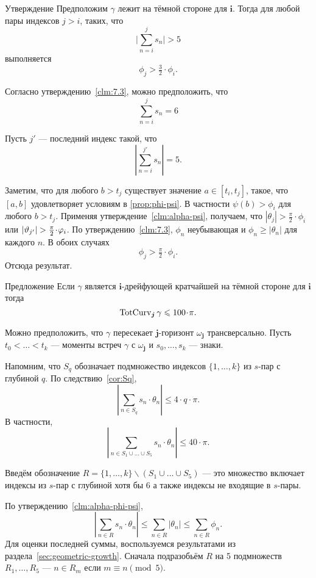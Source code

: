 \documentclass[a4paper,10pt]{article}
\begin{document}
\begin{thm}{Утверждение}\label{clm:geometric-grouth}
Предположим $\gamma$ лежит на тёмной стороне для $\bm{i}$.
Тогда для любой пары индексов $j>i$,
таких, что
\[\bigl|\sum_{n=i}^{j}s_n\bigr|> 5\]
выполняется
\[\phi_j>\tfrac32\cdot\phi_i.\]

\end{thm}


Согласно утверждению~\ref{clm:7.3}, можно предположить, что 
\[\sum_{n=i}^{j}s_n= 6\]

Пусть $j'$ --- последний индекс такой, что
\[|\sum_{n=i}^{j'} s_n|=5.\]

Заметим, что для любого $b>t_j$ существует значение $a\in[t_i,t_j]$,
такое, что $[a,b]$ удовлетворяет условиям в \ref{prop:phi-psi}.
В частности $\psi(b)>\phi_i$ для любого $b>t_j$.
Применяя утверждение~\ref{clm:alpha-psi},
получаем, что $|\theta_j|>\tfrac\pi2\cdot \phi_i$ или
$|\theta_{j'}|\zz>\tfrac\pi2\cdot \phi_i$.
По утверждению~\ref{clm:7.3}, $\phi_n$ неубывающая и $\phi_n\ge |\theta_n|$ для каждого $n$.
В обоих случаях
\[\phi_j>\tfrac\pi2\cdot \phi_i.\]
Отсюда результат.
\qeds



\begin{thm}{Предложение}\label{prop:graph}
Если $\gamma$ является $\bm{i}$-дрейфующей кратчайшей на тёмной стороне для $\bm{i}$ тогда
\[\tc_{\bm{j}}\gamma\le 100\cdot\pi.\]

\end{thm}

Можно предположить, что
$\gamma$ пересекает $\bm{j}$-горизонт $\omega_{\bm{j}}$ трансверсально.
Пусть $t_0<\dots<t_k$ --- моменты встреч $\gamma$ с $\omega_{\bm{j}}$ и
$s_0,\dots,s_k$ --- знаки.

Напомним, что $S_q$ обозначает подмножество индексов $\{1,\dots,k\}$ из $s$-пар с глубиной $q$.
По следствию~\ref{cor:Sq},
\[\left|\sum_{n\in S_q}s_n\cdot\theta_n\right|\le 4\cdot q\cdot \pi.\]
В частности,
\[\left|\sum_{n\in S_1\cup\dots\cup S_5}
s_n\cdot\theta_n\right|
\le 
40\cdot\pi.\]

Введём обозначение $R=\{1,\dots,k\}\backslash (S_1\cup\dots\cup S_5)$ ---
это множество включает индексы из $s$-пар с глубиной хотя бы $6$ 
а также индексы не входящие в $s$-пары.

По утверждению~\ref{clm:alpha-phi-psi},
\[\left|\sum_{n\in R}
s_n\cdot\theta_n\right|
\le
\sum_{n\in R}
|\theta_n|\le \sum_{n\in R}\phi_n.\] 
Для оценки последней суммы, воспользуемся результатами из раздела~\ref{sec:geometric-growth}.
Сначала подразобьём $R$ на 5 подмножеств $R_1,\dots,R_5$ --- 
$n\in R_m$ если $m\equiv n\pmod 5$.
\end{document}
